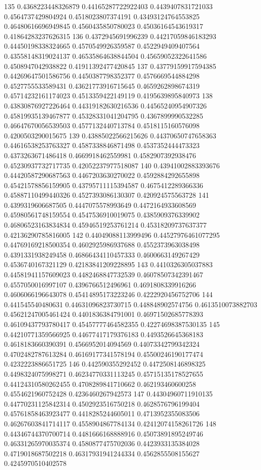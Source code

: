 135 0.4368223448326879 0.44165287722922403 0.4439407831721033 0.4564737429804924 0.4518023807374191 0.43493124764553825 0.46480616696949845 0.4560435850780023 0.45036164543619317 0.41864283237626315
136 0.4372945691996239 0.44217059846183293 0.44450198338324665 0.4570549926359587 0.4522949409407564 0.43558148319024137 0.46535864638844504 0.45659052322641586 0.4508947042938822 0.41911392477420845
137 0.43779159917594385 0.44269647501586756 0.4450387798352377 0.4576669544884298 0.4527755533589431 0.43621773916715645 0.4659262898674319 0.45714232161174023 0.4513359422149119 0.4195639895840973
138 0.43830876927226464 0.44319182630216536 0.44565240954907326 0.45819935139467877 0.45328331041204795 0.4367899990532285 0.46647670056539503 0.4577132440713784 0.4518115160576098 0.4200503290015675
139 0.43885022566215626 0.44370650747658363 0.44616538253763327 0.4587338846871498 0.4537352444473323 0.4373263671486418 0.4669918462559981 0.4582907392938476 0.45230937732717735 0.42052237977518087
140 0.43941002883393676 0.44420587290687563 0.4467203630270022 0.4592884292655898 0.45421578856159905 0.43795711115394587 0.4675412289366336 0.45887110499440326 0.4527393086130307 0.420924575563728
141 0.4399319606687505 0.4447075578993649 0.4472164933608569 0.45980561748159554 0.4547536910019075 0.4385909376339902 0.46806523163834834 0.45946519253761214 0.45318209737637377 0.42136290785816005
142 0.44049088113999496 0.44527976461077295 0.44769169218500354 0.4602925986937688 0.4552373963038498 0.4391331938249458 0.46866434110457333 0.4600663149267429 0.4536740167321129 0.42183841209228895
143 0.4410326305037883 0.44581941157609023 0.4482468847732539 0.46078507342391467 0.4557050016997107 0.4396766512496961 0.4691808339916266 0.4606066196643078 0.45414895173223246 0.4222920456752706
144 0.441545540480631 0.44631096823730715 0.448848902574756 0.4613510073882703 0.45621247005461424 0.4401836384791001 0.46971502685778393 0.46109437793780417 0.45457777464582355 0.42274698387530135
145 0.44210771359566925 0.44677417179376183 0.4493526645368183 0.4618183660390391 0.4566952014094569 0.44073342799342324 0.4702482787613284 0.46169177341578194 0.45500246190177474 0.4232223886651725
146 0.442590355292452 0.4472508146898325 0.4498324075998271 0.46234770331113245 0.45715135178527655 0.44124310580262455 0.4708289841710662 0.462193460600258 0.4554621960752428 0.4236460267942573
147 0.44304960711910135 0.44770231125842314 0.4502923516750218 0.4628576796199404 0.45761858463923477 0.4418285244605011 0.4713952355083506 0.46267603841714117 0.4558904867784134 0.42412074158261726
148 0.44346744370700714 0.4481666168888916 0.45073891895249746 0.46331265970035374 0.4580877475702036 0.4423933135384028 0.4719018687502218 0.46317931941244334 0.4562855508155627 0.4245970510402578
